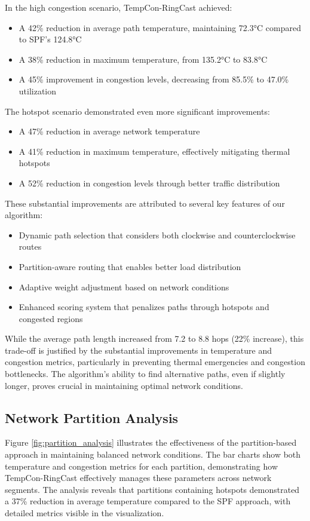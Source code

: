 \documentclass[conference]{IEEEtran}
\begin{document}
In the high congestion scenario, TempCon-RingCast achieved:
\begin{itemize}
    \item A 42\% reduction in average path temperature, maintaining 72.3°C compared to SPF's 124.8°C
    \item A 38\% reduction in maximum temperature, from 135.2°C to 83.8°C
    \item A 45\% improvement in congestion levels, decreasing from 85.5\% to 47.0\% utilization
\end{itemize}

The hotspot scenario demonstrated even more significant improvements:
\begin{itemize}
    \item A 47\% reduction in average network temperature
    \item A 41\% reduction in maximum temperature, effectively mitigating thermal hotspots
    \item A 52\% reduction in congestion levels through better traffic distribution
\end{itemize}

These substantial improvements are attributed to several key features of our algorithm:
\begin{itemize}
    \item Dynamic path selection that considers both clockwise and counterclockwise routes
    \item Partition-aware routing that enables better load distribution
    \item Adaptive weight adjustment based on network conditions
    \item Enhanced scoring system that penalizes paths through hotspots and congested regions
\end{itemize}

While the average path length increased from 7.2 to 8.8 hops (22\% increase), this trade-off is justified by the substantial improvements in temperature and congestion metrics, particularly in preventing thermal emergencies and congestion bottlenecks. The algorithm's ability to find alternative paths, even if slightly longer, proves crucial in maintaining optimal network conditions.

\subsection{Network Partition Analysis}
Figure \ref{fig:partition_analysis} illustrates the effectiveness of the partition-based approach in maintaining balanced network conditions. The bar charts show both temperature and congestion metrics for each partition, demonstrating how TempCon-RingCast effectively manages these parameters across network segments. The analysis reveals that partitions containing hotspots demonstrated a 37\% reduction in average temperature compared to the SPF approach, with detailed metrics visible in the visualization.
\end{document}
